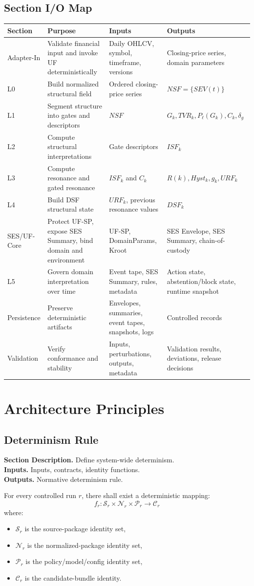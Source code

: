 \documentclass[11pt]{report}
\newcommand{\meta}[3]{\textbf{Section Description.} #1\\
\textbf{Inputs.} #2\\
\textbf{Outputs.} #3\par}
\begin{document}
\section{Section I/O Map}
\begin{longtable}{p{}p{}p{}p{}}
\toprule
Section & Purpose & Inputs & Outputs \\
\midrule
Adapter-In & Validate financial input and invoke UF deterministically & Daily OHLCV, symbol, timeframe, versions & Closing-price series, domain parameters \\
L0 & Build normalized structural field & Ordered closing-price series & $NSF=\{SEV(t)\}$ \\
L1 & Segment structure into gates and descriptors & $NSF$ & $G_k,TVR_k,P_\ell(G_k),C_k,\delta_g$ \\
L2 & Compute structural interpretations & Gate descriptors & $ISF_k$ \\
L3 & Compute resonance and gated resonance & $ISF_k$ and $C_k$ & $R(k),Hyst_k,g_k,URF_k$ \\
L4 & Build DSF structural state & $URF_k$, previous resonance values & $DSF_k$ \\
SES/UF-Core & Protect UF-SP, expose SES Summary, bind domain and environment & UF-SP, DomainParams, Kroot & SES Envelope, SES Summary, chain-of-custody \\
L5 & Govern domain interpretation over time & Event tape, SES Summary, rules, metadata & Action state, abstention/block state, runtime snapshot \\
Persistence & Preserve deterministic artifacts & Envelopes, summaries, event tapes, snapshots, logs & Controlled records \\
Validation & Verify conformance and stability & Inputs, perturbations, outputs, metadata & Validation results, deviations, release decisions \\
\bottomrule
\end{longtable}
\chapter{Architecture Principles}
\section{Determinism Rule}
\meta{Define system-wide determinism.}{Inputs, contracts, identity functions.}{Normative determinism rule.}

For every controlled run \(r\), there shall exist a deterministic mapping:
\[
f_r : \mathcal{S}_r \times \mathcal{N}_r \times \mathcal{P}_r \rightarrow \mathcal{C}_r
\]
where:
\begin{itemize}
    \item \(\mathcal{S}_r\) is the source-package identity set,
    \item \(\mathcal{N}_r\) is the normalized-package identity set,
    \item \(\mathcal{P}_r\) is the policy/model/config identity set,
    \item \(\mathcal{C}_r\) is the candidate-bundle identity.
\end{itemize}
\end{document}
